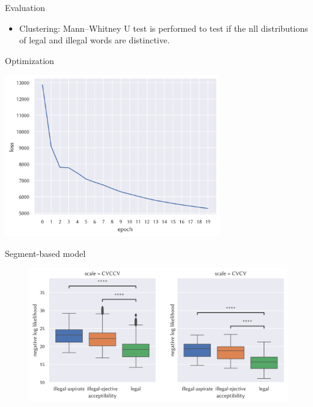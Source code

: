 \begin{frame}{Evaluation}
    \begin{itemize}
        \item Clustering: Mann–Whitney U test is performed to test if the \textsf{nll} distributions of legal and illegal words are distinctive. 
    \end{itemize}
    
\end{frame}

\begin{frame}{Optimization}
\begin{center}
    \includegraphics[width=0.7\textwidth]{fig/log.png}    
\end{center}
\end{frame}

\begin{frame}{Segment-based model}
    \begin{figure}[h]
        \centering
        \includegraphics[width=\textwidth]{fig/fig:boxplot-seg.png}
    \end{figure}
\end{frame}


